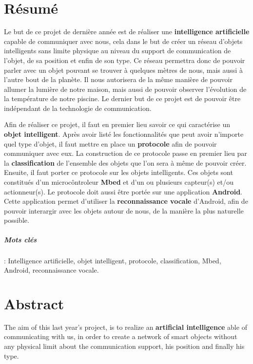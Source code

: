 
\chapter*{Résumé}
Le but de ce projet de dernière année est de réaliser une \textbf{intelligence artificielle} capable de communiquer avec nous, cela dans le but de créer un réseau d'objets intelligents sans limite physique au niveau du support de communication de l'objet, de sa position et enfin de son type. Ce réseau permettra donc de pouvoir parler avec un objet pouvant se trouver à quelques mètres de nous, mais aussi à l'autre bout de la planète. Il nous autorisera de la même manière de pouvoir allumer la lumière de notre maison, mais aussi de pouvoir observer l'évolution de la température de notre piscine. Le dernier but de ce projet est de pouvoir être indépendant de la technologie de communication.

Afin de réaliser ce projet, il faut en premier lieu savoir ce qui caractérise un \textbf{objet intelligent}. Après avoir listé les fonctionnalités que peut avoir n'importe quel type d'objet, il faut mettre en place un \textbf{protocole} afin de pouvoir communiquer avec eux. La construction de ce protocole passe en premier lieu par la \textbf{classification} de l'ensemble des objets que l'on sera à même de pouvoir créer. Ensuite, il faut porter ce protocole sur les objets intelligents. Ces objets sont constitués d'un microcôntroleur \textbf{Mbed} et d'un ou plusieurs capteur(s) et/ou actionneur(s). Le protocole doit aussi être portée sur une application \textbf{Android}. Cette application permet d'utiliser la \textbf{reconnaissance vocale} d'Android, afin de pouvoir interargir avec les objets autour de nous, de la manière la plus naturelle possible.
	
   \paragraph{Mots clés}: Intelligence artificielle, objet intelligent, protocole, classification, Mbed, Android, reconnaissance vocale.
   
\clearemptydoublepage
   
 \chapter*{Abstract}
The aim of this last year's project, is to realize an \textbf{artificial intelligence} able of communicating with us, in order to create a network of smart objects without any physical limit about the communication support, his position and finally his type.

